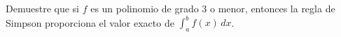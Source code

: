 \item Demuestre que si $f$ es un polinomio de grado 3 o menor, entonces la regla de Simpson proporciona el valor exacto de $\int_a^b f(x) \, dx$.
